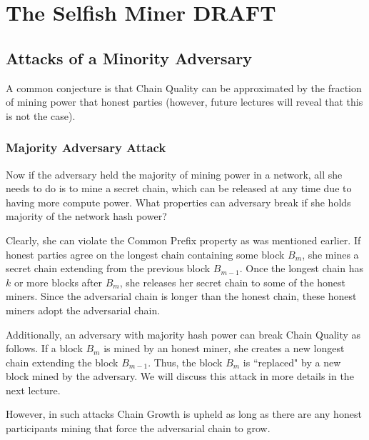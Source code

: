 \chapter{The Selfish Miner \small{\textsf{DRAFT}}}

\section{Attacks of a Minority Adversary}
A common conjecture is that Chain Quality can be approximated by the fraction of mining power that honest parties (however, future lectures will reveal that this is not the case).


\subsection{Majority Adversary Attack}
Now if the adversary held the majority of mining power in a network, all she needs to do is to mine a secret chain, which can be released at any time due to having more compute power. What properties can adversary break if she holds majority of the network hash power?

Clearly, she can violate the Common Prefix property as was mentioned earlier. If honest parties agree on the longest chain containing some block $B_m$, she mines a secret chain extending from the previous block $B_{m-1}$. Once the longest chain has $k$ or more blocks after $B_m$, she releases her secret chain to some of the honest miners. Since the adversarial chain is longer than the honest chain, these honest miners adopt the adversarial chain.

Additionally, an adversary with majority hash power can break Chain Quality as follows. If a block $B_m$ is mined by an honest miner, she creates a new longest chain extending the block $B_{m-1}$. Thus, the block $B_m$ is ``replaced" by a new block mined by the adversary. We will discuss this attack in more details in the next lecture.

However, in such attacks Chain Growth is upheld as long as there are any honest participants mining that force the adversarial chain to grow.

